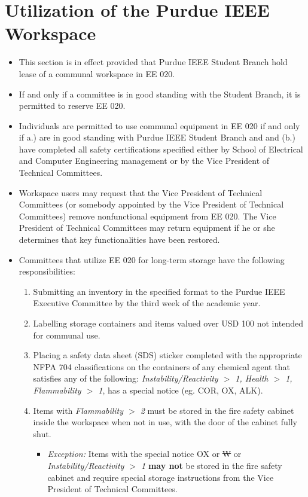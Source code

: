 \documentclass[12pt]{constitution}
\begin{document}
\section{Utilization of the Purdue IEEE Workspace}
\label{sec:tech_workspace}
\begin{itemize}
    \item This section is in effect provided that Purdue IEEE Student Branch hold lease of a communal workspace in EE 020.
    \item If and only if a committee is in good standing with the Student Branch, it is permitted to reserve EE 020.
    \item Individuals are permitted to use communal equipment in EE 020 if and only if a.) are in good standing with Purdue IEEE Student Branch and and (b.) have completed all safety certifications specified either by School of Electrical and Computer Engineering management or by the Vice President of Technical Committees.
    \item Workspace users may request that the Vice President of Technical Committees (or somebody appointed by the Vice President of Technical Committees) remove nonfunctional equipment from EE 020. The Vice President of Technical Committees may return equipment if he or she determines that key functionalities have been restored.
    \item Committees that utilize EE 020 for long-term storage have the following responsibilities:
    \begin{enumerate}
        \item Submitting an inventory in the specified format to the Purdue IEEE Executive Committee by the third week of the academic year.
        \item Labelling storage containers and items valued over USD 100 not intended for communal use.
        \item Placing a safety data sheet (SDS) sticker completed with the appropriate NFPA 704 classifications on the containers of any chemical agent that satisfies any of the following: \emph{Instability/Reactivity $>$ 1, Health $>$ 1, Flammability $>$ 1}, has a special notice (eg. COR, OX, ALK).
        \item Items with \emph{Flammability $>$ 2} must be stored in the fire safety cabinet inside the workspace when not in use, with the door of the cabinet fully shut.
        \begin{itemize}
            \item \emph{Exception:} Items with the special notice OX or \st{W} or \emph{Instability/Reactivity $>$ 1} \textbf{may not} be stored in the fire safety cabinet and require special storage instructions from the Vice President of Technical Committees. 

\end{itemize}
\end{enumerate}
\end{itemize}
\end{document}
